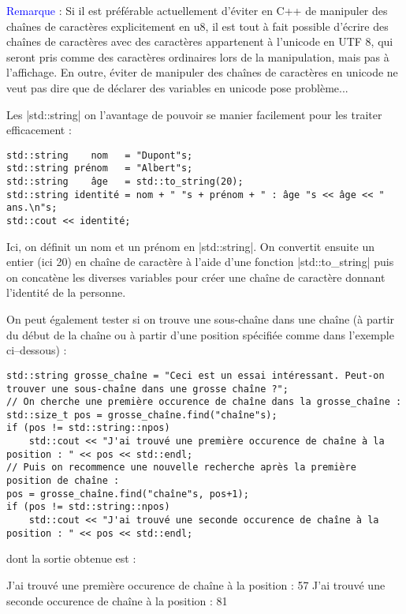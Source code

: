 \textcolor{blue}{Remarque} : Si il est préférable actuellement d'éviter en C++ de manipuler des chaînes de caractères
explicitement en u8, il est tout à fait possible d'écrire des chaînes de caractères avec des caractères appartenent à
l'unicode en UTF 8, qui seront pris comme des caractères ordinaires lors de la manipulation, mais pas à l'affichage.
En outre, éviter de manipuler des chaînes de caractères en unicode ne veut pas dire que de déclarer des variables en unicode pose problème...

Les |std::string| on l'avantage de pouvoir se manier facilement pour les traiter efficacement :
\begin{lstlisting}[caption=Exemple de manipulation de std::string]
std::string    nom   = "Dupont"s;
std::string prénom   = "Albert"s;
std::string    âge   = std::to_string(20);
std::string identité = nom + " "s + prénom + " : âge "s << âge << " ans.\n"s;
std::cout << identité;
\end{lstlisting}

Ici, on définit un nom et un prénom en |std::string|. On convertit ensuite un entier (ici 20) en chaîne de caractère
à l'aide d'une fonction |std::to_string| puis on concatène les diverses variables pour créer une chaîne de caractère
donnant l'identité de la personne.

On peut également tester si on trouve une sous-chaîne dans une chaîne (à partir du début de la chaîne ou à partir d'une position spécifiée comme dans l'exemple ci--dessous) :
\begin{lstlisting}[caption=Exemple de recherche d'une sous-chaîne dans une chaîne]
std::string grosse_chaîne = "Ceci est un essai intéressant. Peut-on trouver une sous-chaîne dans une grosse chaîne ?";
// On cherche une première occurence de chaîne dans la grosse_chaîne :
std::size_t pos = grosse_chaîne.find("chaîne"s);
if (pos != std::string::npos)
    std::cout << "J'ai trouvé une première occurence de chaîne à la position : " << pos << std::endl;
// Puis on recommence une nouvelle recherche après la première position de chaîne :
pos = grosse_chaîne.find("chaîne"s, pos+1);
if (pos != std::string::npos)
    std::cout << "J'ai trouvé une seconde occurence de chaîne à la position : " << pos << std::endl;
\end{lstlisting}
dont la sortie obtenue est :
\begin{inverseverbatim}
J'ai trouvé une première occurence de chaîne à la position : 57
J'ai trouvé une seconde occurence de chaîne à la position : 81
\end{inverseverbatim}

